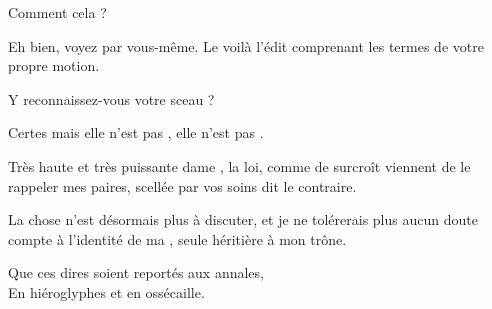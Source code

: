 \begin{drama}
  \reinespeaks Comment cela ?

  \nobleOnespeaks Eh bien, voyez par vous-même. Le voilà l’édit comprenant les termes de votre propre motion.

  \nobleTwospeaks Y reconnaissez-vous votre sceau ?

  \reinespeaks Certes mais elle n’est pas \princesse, elle n’est pas \princesse.

  \nobleOnespeaks Très haute et très puissante dame \reine, la loi, comme de surcroît viennent de le rappeler mes paires, scellée par vos soins dit le contraire.

  \roispeaks La chose n’est désormais plus à discuter, et je ne tolérerais plus  aucun doute compte à l’identité de ma \princesse, seule héritière à mon trône.

  \begin{minipage}[t]{\linewidth}
    Que ces dires soient reportés aux annales,\\
    En hiéroglyphes et en ossécaille.
  \end{minipage}
\end{drama}


\scene

\StageDirII{\elena, \alexas}

